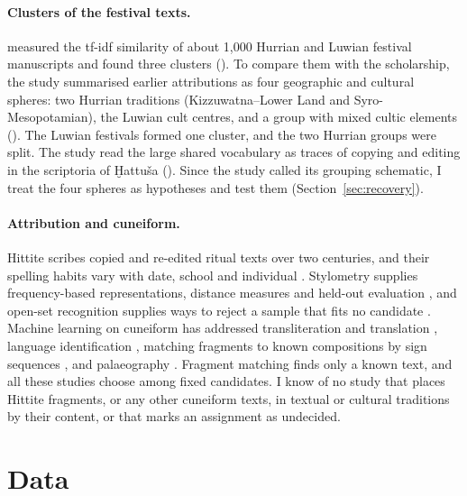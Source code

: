 \documentclass[11pt]{article}
\begin{document}
\paragraph{Clusters of the festival texts.}
\citet{gordin2025matters} measured the tf-idf similarity of about 1,000 Hurrian and Luwian
festival manuscripts and found three clusters (\citeyear[109f.]{gordin2025matters}). To compare them with
the scholarship, the study summarised earlier attributions as four geographic and cultural
spheres: two Hurrian traditions (Kizzuwatna--Lower Land and Syro-Mesopotamian), the Luwian cult
centres, and a group with mixed cultic elements (\citeyear[Table~3]{gordin2025matters}). The
Luwian festivals formed one cluster, and the two Hurrian groups were split. The study read the large shared
vocabulary as traces of copying and editing in the scriptoria of Ḫattuša
(\citeyear[112--115]{gordin2025matters}). Since the study called its grouping schematic, I treat
the four spheres as hypotheses and test them (Section~\ref{sec:recovery}).

\paragraph{Attribution and cuneiform.}
Hittite scribes copied and re-edited ritual texts over two centuries, and their spelling habits
vary with date, school and individual
\citep{gordin2015scribal,weeden2011logograms,vandenhout2009dating,waal2015diplomatics}.
Stylometry supplies frequency-based representations, distance measures and held-out evaluation
\citep{burrows2002delta,juola2008authorship,stamatatos2009survey}, and open-set recognition
supplies ways to reject a sample that fits no candidate \citep{scheirer2013openset}. Machine
learning on cuneiform has addressed transliteration and translation
\citep{gordin2020reading,gutherz2023translating,yavasan2025clay},
language identification \citep{jauhiainen2019cuneiform}, matching fragments to known compositions
by sign sequences \citep{simonjetz2024reconstruction}, and palaeography \citep{yugay2024stylistic}.
Fragment matching finds only a known text, and all these studies choose among fixed candidates. I
know of no study that places Hittite fragments, or any other cuneiform texts, in textual or
cultural traditions by their content, or that marks an assignment as undecided.

\section{Data}
\label{sec:data}
\end{document}
